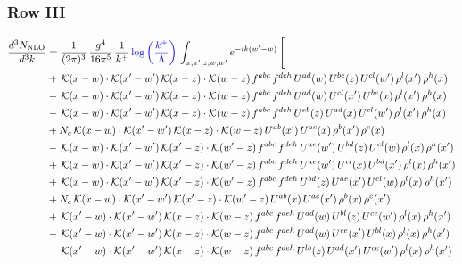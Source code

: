 \documentclass[9pt]{article}
\numberwithin{equation}{section}
\begin{document}
 \subsubsection{Row III}
 \begin{align}
\frac{d^{3}N_{\mathrm{NLO}}}{d^{3}k} & = \frac{1}{(2\pi)^{3}}\,\frac{g^{4}}{16\pi^{5}}\,\frac{1}{k^{+}}\,{\color{blue}\log{\left(\frac{k^{+}}{\Lambda}\right)}}\,\int_{x,x',z,w,w'}e^{-ik(w'-w)}\,\Bigg[\notag\\ &  +\,\mathcal{K}(x-w)\cdot\mathcal{K}(x'-w')\,\mathcal{K}(x-z)\cdot\mathcal{K}(w-z)\,f^{abc}\,f^{deh}\,U^{ad}(w)\,U^{be}(z)\,U^{cl}(w')\,\rho^{l}(x')\,\rho^{h}(x)\notag\\
& -\,\mathcal{K}(x-w)\cdot\mathcal{K}(x'-w')\,\mathcal{K}(x-z)\cdot\mathcal{K}(w-z)\,f^{abc}\,f^{deh}\,U^{ad}(w)\,U^{cl}(x')\,U^{be}(x)\,\rho^{l}(x')\,\rho^{h}(x)\notag\\
& -\,\mathcal{K}(x-w)\cdot\mathcal{K}(x'-w')\,\mathcal{K}(x-z)\cdot\mathcal{K}(w-z)\,f^{abc}\,f^{deh}\,U^{eb}(z)\,U^{ad}(x)\,U^{cl}(w')\,\rho^{l}(x')\,\rho^{h}(x)\notag\\
& +N_{c}\,\mathcal{K}(x-w)\cdot\mathcal{K}(x'-w')\,\mathcal{K}(x-z)\cdot\mathcal{K}(w-z)\,U^{ab}(x')\,U^{ac}(x)\,\rho^{b}(x')\,\rho^{c}(x)\notag\\
& -\,\mathcal{K}(x-w)\cdot\mathcal{K}(x'-w')\,\mathcal{K}(x'-z)\cdot\mathcal{K}(w'-z)\,f^{abc}\,f^{deh}\,U^{ae}(w')\,U^{bd}(z)\,U^{cl}(w)\,\rho^{l}(x)\,\rho^{h}(x')\notag\\
& +\,\mathcal{K}(x-w)\cdot\mathcal{K}(x'-w')\,\mathcal{K}(x'-z)\cdot\mathcal{K}(w'-z)\,f^{abc}\,f^{deh}\,U^{ae}(w')\,U^{cl}(x)\,U^{bd}(x')\,\rho^{l}(x)\,\rho^{h}(x')\notag\\
& +\,\mathcal{K}(x-w)\cdot\mathcal{K}(x'-w')\,\mathcal{K}(x'-z)\cdot\mathcal{K}(w'-z)\,f^{abc}\,f^{deh}\,U^{bd}(z)\,U^{ae}(x')\,U^{cl}(w)\,\rho^{l}(x)\,\rho^{h}(x')\notag\\
& +N_{c}\,\mathcal{K}(x-w)\cdot\mathcal{K}(x'-w')\,\mathcal{K}(x'-z)\cdot\mathcal{K}(w'-z)\,U^{ab}(x)\,U^{ac}(x')\,\rho^{b}(x)\,\rho^{c}(x')\notag\\
& +\,\mathcal{K}(x'-w)\cdot\mathcal{K}(x'-w')\,\mathcal{K}(x-z)\cdot\mathcal{K}(w-z)\,f^{abc}\,f^{deh}\,U^{ad}(w)\,U^{bl}(z)\,U^{ce}(w')\,\rho^{l}(x)\,\rho^{h}(x')\notag\\
& -\,\mathcal{K}(x'-w)\cdot\mathcal{K}(x'-w')\,\mathcal{K}(x-z)\cdot\mathcal{K}(w-z)\,f^{abc}\,f^{deh}\,U^{ad}(w)\,U^{ce}(x')\,U^{bl}(x)\,\rho^{l}(x)\,\rho^{h}(x')\notag\\
& -\,\mathcal{K}(x'-w)\cdot\mathcal{K}(x'-w')\,\mathcal{K}(x-z)\cdot\mathcal{K}(w-z)\,f^{abc}\,f^{deh}\,U^{lb}(z)\,U^{ad}(x')\,U^{ce}(w')\,\rho^{l}(x)\,\rho^{h}(x')\notag\\

\end{align}
\end{document}
